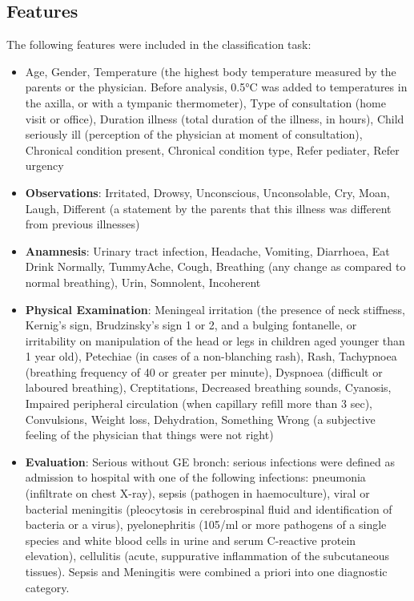 \subsection{Features}
The following features were included in the classification task:
\begin{itemize}
\item Age, Gender, Temperature (the highest body temperature measured by the parents or the physician. Before analysis, 0.5°C was added to temperatures in the axilla, or with a tympanic thermometer), Type of consultation (home visit or office), Duration illness (total duration of the illness, in hours), Child seriously ill (perception of the physician at moment of consultation), Chronical condition present, Chronical condition type, Refer pediater, Refer urgency
\item \textbf{Observations}: Irritated, Drowsy, Unconscious, Unconsolable, Cry, Moan, Laugh, Different (a statement by the parents that this illness was different from previous illnesses)
\item \textbf{Anamnesis}: Urinary tract infection, Headache, Vomiting, Diarrhoea, Eat Drink Normally, TummyAche, Cough, Breathing (any change as compared to normal breathing), Urin, Somnolent, Incoherent
\item \textbf{Physical Examination}: Meningeal irritation (the presence of neck stiffness, Kernig's sign, Brudzinsky's sign 1 or 2, and a bulging fontanelle, or irritability on manipulation of the head or legs in children aged younger than 1 year old), Petechiae (in cases of a non-blanching rash), Rash, Tachypnoea (breathing frequency of 40 or greater per minute), Dyspnoea (difficult or laboured breathing), Creptitations, Decreased breathing sounds, Cyanosis, Impaired peripheral circulation (when capillary refill more than 3 sec), Convulsions, Weight loss, Dehydration, Something Wrong (a subjective feeling of the physician that things were not right)
\item \textbf{Evaluation}: Serious without GE bronch: serious infections were defined as admission to hospital with one of the following infections: pneumonia (infiltrate on chest X-ray), sepsis (pathogen in haemoculture), viral or bacterial meningitis (pleocytosis in cerebrospinal fluid and identification of bacteria or a virus), pyelonephritis (105/ml or more pathogens of a single species and white blood cells in urine and serum C-reactive protein elevation), cellulitis (acute, suppurative inflammation of the subcutaneous tissues).  Sepsis and Meningitis were combined a priori into one diagnostic category.
\end{itemize}

